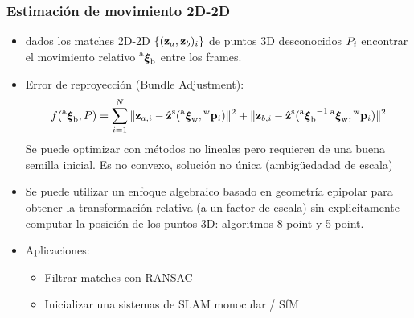 \begin{frame}
	\frametitle{Estimación de movimiento 2D-2D}
	\footnotesize
	
	\begin{itemize}
		\item dados los matches 2D-2D $\{(\boldsymbol{\mathbf{z}}_{a}, \boldsymbol{\mathbf{z}}_{b})_{i}\}$ de puntos 3D desconocidos $P_{i}$ encontrar el movimiento relativo $\prescript{\mathrm{a}}{}{{\boldsymbol{\mathbf{\xi}}}_\mathrm{b}}$ entre los frames.
		\item Error de reproyección (Bundle Adjustment):
		\[
		f(\prescript{\mathrm{a}}{}{{\boldsymbol{\mathbf{\xi}}}_\mathrm{b}}, P)= \sum_{i=1}^{N} \Vert \boldsymbol{\mathbf{z}}_{a,i} - \hat{\boldsymbol{\mathbf{z}}}^{\mathrm{s}}(\prescript{\mathrm{a}}{}{{\boldsymbol{\mathbf{\xi}}}_\mathrm{\mathrm{w}}},\prescript{\mathrm{\mathrm{w}}}{}{\boldsymbol{\mathbf{p}}}_{i}) \Vert^{2} + \Vert \boldsymbol{\mathbf{z}}_{b,i} - \hat{\boldsymbol{\mathbf{z}}}^{\mathrm{s}}({\prescript{\mathrm{a}}{}{{\boldsymbol{\mathbf{\xi}}}_\mathrm{b}}}^{-1}\prescript{\mathrm{a}}{}{{\boldsymbol{\mathbf{\xi}}}_\mathrm{\mathrm{w}}},\prescript{\mathrm{\mathrm{w}}}{}{\boldsymbol{\mathbf{p}}}_{i}) \Vert^{2}
		\]
		Se puede optimizar con métodos no lineales pero requieren de una buena semilla inicial. Es no convexo, solución no única (ambigüedadad de escala)
		\item Se puede utilizar un enfoque algebraico basado en geometría epipolar para obtener la transformación relativa (a un factor de escala) sin explicitamente computar la posición de los puntos 3D: algoritmos 8-point y 5-point.
		\item Aplicaciones:
		\begin{itemize}
			\item Filtrar matches con RANSAC
			\item Inicializar una sistemas de SLAM monocular / SfM
		\end{itemize}
	\end{itemize}
\end{frame}

